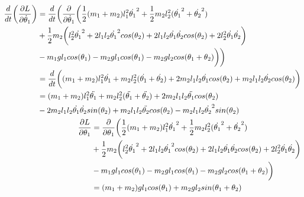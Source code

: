 \begin{subequations}
\begin{align}
\begin{split}
	\frac{d}{dt} \bigg{(} \frac{\partial L}{\partial \dot{\theta}_{1}} \bigg{)}
	&= \frac{d}{dt} \bigg{(} \frac{\partial}{\partial \dot{\theta}_{1}} \bigg{(}
	\frac{1}{2}(m_{1} + m_{2})l_{1}^{2}\dot{\theta_{1}}^{2} +
	\frac{1}{2}m_{2}l_{2}^{2}(\dot{\theta_{1}}^{2} + \dot{\theta_{2}}^{2})
	\\
	& + \frac{1}{2}m_{2} \bigg{(} l_{2}^{2}\dot{\theta_{1}}^{2}
	+ 2l_{1}l_{2}\dot{\theta_{1}}^{2}cos(\theta_{2}) + 2l_{1}l_{2}\dot{\theta_{1}}\dot{\theta_{2}}cos(\theta_{2})
	+ 2l_{2}^{2}\dot{\theta_{1}}\dot{\theta_{2}} \bigg{)}
	\\
	& - m_{1}gl_{1}cos(\theta_{1}) - m_{2}gl_{1}cos(\theta_{1}) - m_{2}gl_{2}cos(\theta_{1} + \theta_{2})
	\bigg{)} \bigg{)}
	\\
	&= \frac{d}{dt} \bigg{(}
	(m_{1} + m_{2})l_{1}^{2}\dot{\theta_{1}} +
	m_{2}l_{2}^{2}(\dot{\theta_{1}} + \dot{\theta_{2}})
	+ 2m_{2}l_{1}l_{2}\dot{\theta_{1}}cos(\theta_{2}) + m_{2}l_{1}l_{2}\dot{\theta_{2}}cos(\theta_{2})
	\bigg{)}
	\\
	&= (m_{1} + m_{2})l_{1}^{2}\ddot{\theta_{1}} +
	m_{2}l_{2}^{2}(\ddot{\theta_{1}} + \ddot{\theta_{2}})
	+ 2m_{2}l_{1}l_{2}\ddot{\theta_{1}}cos(\theta_{2})\\
	&- 2m_{2}l_{1}l_{2}\dot{\theta_{1}}\dot{\theta_{2}}sin(\theta_{2})
	+ m_{2}l_{1}l_{2}\ddot{\theta_{2}}cos(\theta_{2})
	- m_{2}l_{1}l_{2}\dot{\theta_{2}}^{2}sin(\theta_{2})
\end{split}
	\\
\begin{split}
	\frac{\partial L}{\partial \theta_{1}} &=
	\frac{\partial}{\partial \theta_{1}} \bigg{(}
	\frac{1}{2}(m_{1} + m_{2})l_{1}^{2}\dot{\theta_{1}}^{2} +
	\frac{1}{2}m_{2}l_{2}^{2}(\dot{\theta_{1}}^{2} + \dot{\theta_{2}}^{2})
	\\
	& + \frac{1}{2}m_{2} \bigg{(} l_{2}^{2}\dot{\theta_{1}}^{2}
	+ 2l_{1}l_{2}\dot{\theta_{1}}^{2}cos(\theta_{2}) + 2l_{1}l_{2}\dot{\theta_{1}}\dot{\theta_{2}}cos(\theta_{2})
	+ 2l_{2}^{2}\dot{\theta_{1}}\dot{\theta_{2}} \bigg{)}
	\\
	& - m_{1}gl_{1}cos(\theta_{1}) - m_{2}gl_{1}cos(\theta_{1}) - m_{2}gl_{2}cos(\theta_{1} + \theta_{2})
	\bigg{)}
	\\	
	&= (m_{1} + m_{2})gl_{1}cos(\theta_{1}) + m_{2}gl_{2}sin(\theta_{1} + \theta_{2})
\end{split}
\end{align}
\end{subequations}
